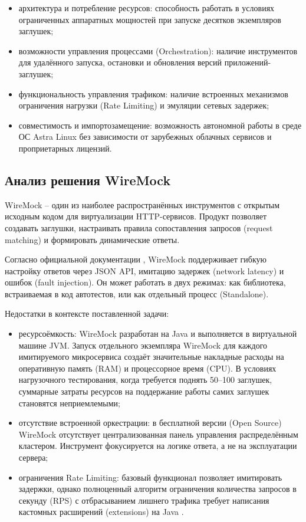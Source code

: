 \begin{itemize}
\item архитектура и потребление ресурсов: способность работать в условиях ограниченных аппаратных мощностей при запуске десятков экземпляров заглушек;
\item возможности управления процессами (Orchestration): наличие инструментов для удалённого запуска, остановки и обновления версий приложений-заглушек;
\item функциональность управления трафиком: наличие встроенных механизмов ограничения нагрузки (Rate Limiting) и эмуляции сетевых задержек;
\item совместимость и импортозамещение: возможность автономной работы в среде ОС Astra Linux без зависимости от зарубежных облачных сервисов и проприетарных лицензий.
\end{itemize}

\subsection{Анализ решения WireMock}

WireMock -- один из наиболее распространённых инструментов с открытым исходным кодом для виртуализации HTTP-сервисов. Продукт позволяет создавать заглушки, настраивать правила сопоставления запросов (request matching) и формировать динамические ответы.

Согласно официальной документации \cite{wiremock}, WireMock поддерживает гибкую настройку ответов через JSON API, имитацию задержек (network latency) и ошибок (fault injection). Он может работать в двух режимах: как библиотека, встраиваемая в код автотестов, или как отдельный процесс (Standalone).

Недостатки в контексте поставленной задачи:

\begin{itemize}
\item ресурсоёмкость: WireMock разработан на Java и выполняется в виртуальной машине JVM. Запуск отдельного экземпляра WireMock для каждого имитируемого микросервиса создаёт значительные накладные расходы на оперативную память (RAM) и процессорное время (CPU). В условиях нагрузочного тестирования, когда требуется поднять 50--100 заглушек, суммарные затраты ресурсов на поддержание работы самих заглушек становятся неприемлемыми;
\item отсутствие встроенной оркестрации: в бесплатной версии (Open Source) WireMock отсутствует централизованная панель управления распределённым кластером. Инструмент фокусируется на логике ответа, а не на эксплуатации сервера;
\item ограничения Rate Limiting: базовый функционал позволяет имитировать задержки, однако полноценный алгоритм ограничения количества запросов в секунду (RPS) с отбрасыванием лишнего трафика требует написания кастомных расширений (extensions) на Java \cite{wiremock}.
\end{itemize}

